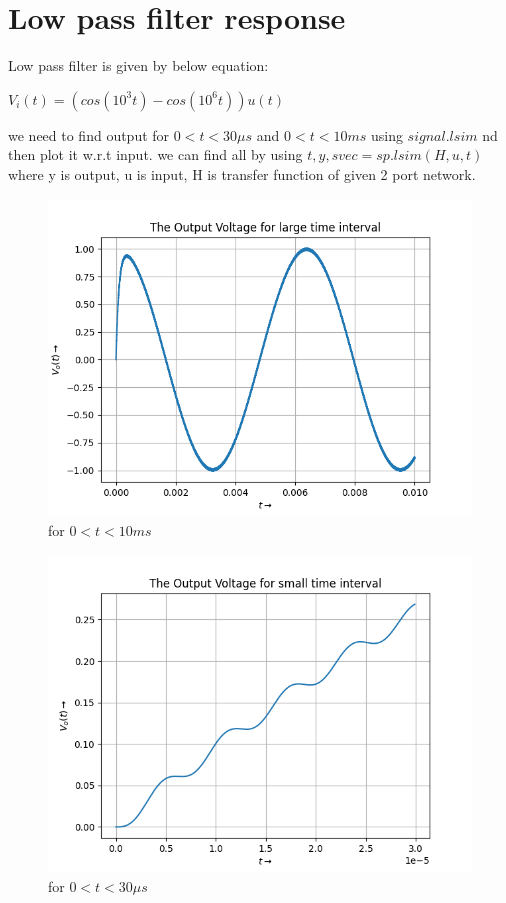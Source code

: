 \documentclass[11pt, a4paper]{article}
\begin{document}
\section{Low pass filter response}
Low pass filter is given by below equation:\newline
\begin{center}
$V_i(t) = (cos(10^3t) - cos(10^6t))u(t)$
\end{center}
we need to find output for $0<t<30\mu s$ and $0<t<10ms$ using $signal.lsim$ nd then plot it w.r.t input.
we can find all by using $t,y,svec=sp.lsim(H,u,t)$ where y is output, u is input, H is transfer function of given 2 port network.
    \begin{figure}[!tbh]
      \centering
      \includegraphics[scale=0.5]{fast_Variation.png}  
      \caption{for $0<t<10ms$} 
      \label{fig:fig5}
    \end{figure}
    \begin{figure}[!tbh]
      \centering
      \includegraphics[scale=0.5]{slow_variation.png}  
      \caption{for $0<t<30\mu s$} 
      \label{fig:fig6}
    \end{figure}
\end{document}
